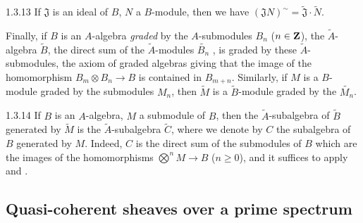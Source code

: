 \begin{env}{1.3.13}
If $\mathfrak{J}$ is an ideal of $B$, $N$ a $B$-module, then we have
$(\mathfrak{J}N)^\sim=\widetilde{\mathfrak{J}}\cdot\widetilde{N}$.

Finally, if $B$ is an $A$-algebra \emph{graded} by the $A$-submodules $B_n$ ($n\in\mathbf{Z}$),
the $\widetilde{A}$-algebra $\widetilde{B}$, the direct sum of the $\widetilde{A}$-modules
$\widetilde{B_n}$ , is graded by these $\widetilde{A}$-submodules, the axiom
of graded algebras giving that the image of the homomorphism $B_m\otimes B_n\to B$ is
contained in $B_{m+n}$. Similarly, if $M$ is a $B$-module graded by the submodules $M_n$,
then $\widetilde{M}$ is a $\widetilde{B}$-module graded by the $\widetilde{M_n}$.
\end{env}

\begin{env}{1.3.14}
\label{env-1.1.3.14}
If $B$ is an $A$-algebra, $M$ a submodule of $B$, then the $\widetilde{A}$-subalgebra of
$\widetilde{B}$ generated by $\widetilde{M}$  is the
$\widetilde{A}$-subalgebra $\widetilde{C}$, where we denote by $C$ the subalgebra of $B$
generated by $M$. Indeed, $C$ is the direct sum of the submodules of $B$ which are the images
of the homomorphisms $\bigotimes^n M\to B$ ($n\geqslant 0$), and it suffices to apply
 and .
\end{env}

\subsection{Quasi-coherent sheaves over a prime spectrum}
\label{1-schemes-1.4}

